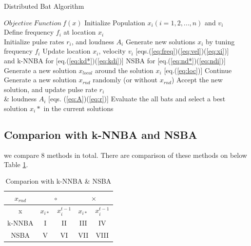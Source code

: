 \documentclass{ies2018}
\begin{document}
\begin{algorithm}[H]
\caption{Distributed Bat Algorithm}
\label{code:sba}
\begin{algorithmic}[1]
\REQUIRE $Objective\ Function\ f(x)$
\STATE Initialize Population $x_i(i=1,2,..., n)$ and $v_i$\\
\STATE Define frequency $f_i$ at location $x_i$ \\
\STATE Initialize pulse rates $r_i$, and loudness $A_i$
\STATE Generate new solutions $x_i$ by tuning frequency $f_i$
\STATE Update location $x_i$, velocity $v_i$  [eqs.(\ref{eq:freq})(\ref{eq:vel})(\ref{eq:xi})] \\ and k-NNBA for [eq.(\ref{eq:kd*})(\ref{eq:kdi})] NSBA for [eq.(\ref{eq:nd*})(\ref{eq:ndi})] 
\STATE Generate a new solution ${x_{local}}$ around the solution $x_{i}$ [eq.(\ref{eq:loc})] 
\ELSE
\STATE Continue
\ENDIF
\STATE Generate a new solution $x_{rnd}$ randomly (or without ${x_{rnd}}$)
\STATE Accept the new solution, and update pulse rate $r_i$ \\ \& loudness $A_i$ [eqs. (\ref{eq:A})(\ref{eq:r})]  
\ENDIF
\ENDFOR
\STATE Evaluate the all bats and select a best solution $x_i*$ in the current solutions
\ENDWHILE
\end{algorithmic}
\end{algorithm}

\subsection{Comparion with k-NNBA and NSBA}
we compare 8 methods in total. There are comparison of these methods on below Table \ref{tb:compare}.  
\begin{table}[h]
\begin{center}
\caption{Comparion with k-NNBA \& NSBA}
\label{tb:compare}
\begin{tabular}{c|c|c|c|c}
\hline 
\multicolumn{1}{c|}{${x_{rnd}}$} & \multicolumn{2}{c|}{$\circ$} & \multicolumn{2}{c}{$\times$}   \\
\hline
 x & ${x_{i*}}$ & ${x_i^{t-1}}$ & ${x_{i*}}$ & ${x_i^{t-1}}$ \\
\hline 
k-NNBA & I & II & III & IV\\
NSBA & V & VI & VII & VIII\\
\hline
\end{tabular}
\end{center}
\end{table}
\end{document}
